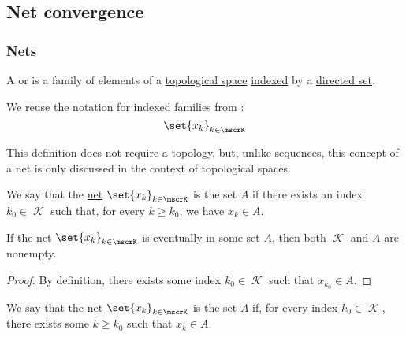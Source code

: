 \subsection{Net convergence}\label{subsec:net_convergence}

\subsubsection{Nets}

\begin{definition}\label{def:topological_net}
  A  or  is a family of elements of a \hyperref[def:topological_space]{topological space} \hyperref[def:cartesian_product/indexed_family]{indexed} by a \hyperref[def:directed_set]{directed set}.

  We reuse the notation for indexed families from :
  \begin{equation*}
    \set{ x_k }_{k \in \mscrK}
  \end{equation*}
\end{definition}
\begin{comments}
  \item This definition does not require a topology, but, unlike sequences, this concept of a net is only discussed in the context of topological spaces.
\end{comments}

\begin{definition}\label{def:net_eventually_in}
  We say that the \hyperref[def:topological_net]{net} \( \set{ x_k }_{k \in \mscrK} \) is  the set \( A \) if there exists an index \( k_0 \in \mscrK \) such that, for every \( k \geq k_0 \), we have \( x_k \in A \).
\end{definition}

\begin{proposition}\label{thm:eventually_in_implies_nonempty}
  If the net \( \set{ x_k }_{k \in \mscrK} \) is \hyperref[def:net_eventually_in]{eventually in} some set \( A \), then both \( \mscrK \) and \( A \) are nonempty.
\end{proposition}
\begin{proof}
  By definition, there exists some index \( k_0 \in \mscrK \) such that \( x_{k_0} \in A \).
\end{proof}

\begin{definition}\label{def:net_frequently_in}
  We say that the \hyperref[def:topological_net]{net} \( \set{ x_k }_{k \in \mscrK} \) is  the set \( A \) if, for every index \( k_0 \in \mscrK \), there exists some \( k \geq k_0 \) such that \( x_k \in A \).
\end{definition}

